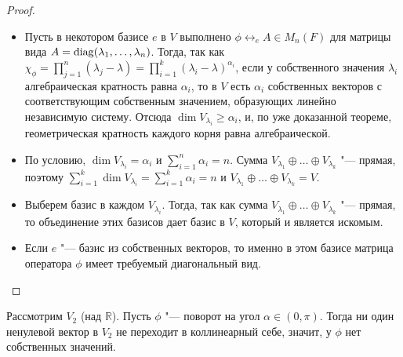 \begin{proof}~
	\begin{itemize}
		\item{}Пусть в некотором базисе $e$ в $V$ выполнено $\phi \leftrightarrow_e A \in M_n(F)$ для матрицы вида $A = \operatorname{diag}(\lambda_1, \dotsc, \lambda_n)$. Тогда, так как $\chi_\phi = \prod_{j = 1}^n(\lambda_j - \lambda) = \prod_{i = 1}^k(\lambda_i - \lambda)^{\alpha_i}$, если у собственного значения $\lambda_i$ алгебраическая кратность равна $\alpha_i$, то в $V$ есть $\alpha_i$ собственных векторов с соответствующим собственным значением, образующих линейно независимую систему. Отсюда $\dim{V_{\lambda_i}} \ge \alpha_i$, и, по уже доказанной теореме, геометрическая кратность каждого корня равна алгебраической.
		
		\item{}По условию, $\dim{V_{\lambda_i}} = \alpha_i$ и $\sum_{i = 1}^n\alpha_i = n$. Сумма $V_{\lambda_1} \oplus \dots \oplus V_{\lambda_k}$ "--- прямая, поэтому $\sum_{i = 1}^k\dim{V_{\lambda_i}} = \sum_{i = 1}^k\alpha_i = n$ и $V_{\lambda_1} \oplus \dots \oplus V_{\lambda_k} = V$.
		
		\item{}Выберем базис в каждом $V_{\lambda_i}$. Тогда, так как сумма $V_{\lambda_1} \oplus \dots \oplus V_{\lambda_k}$ "--- прямая, то объединение этих базисов дает базис в $V$, который и является искомым.
		
		\item{}Если $e$ "--- базис из собственных векторов, то именно в этом базисе матрица оператора $\phi$ имеет требуемый диагональный вид.\qedhere
	\end{itemize}
\end{proof}

\begin{note}
	Рассмотрим $V_2$ (над $\mathbb{R}$). Пусть $\phi$ "--- поворот на угол $\alpha \in (0, \pi)$. Тогда ни один ненулевой вектор в $V_2$ не переходит в коллинеарный себе, значит, у $\phi$ нет собственных значений.
\end{note}